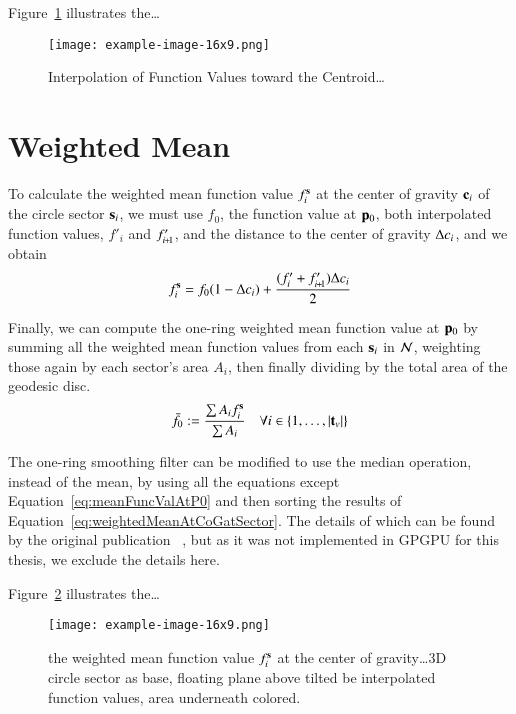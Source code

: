 Figure~\ref{fig:interpolation} illustrates the\dots
\begin{figure}[ht]
\ffigbox
	{\texttt{[image: example-image-16x9.png]}}
	{\caption[Interpolation of Function Values toward the Centroid]{Interpolation of Function Values toward the Centroid\ldots}\label{fig:interpolation}}
\end{figure}

%
%
%
%
\section{Weighted Mean}
\label{ch4sWM}
To calculate the weighted mean function value $f^\bs_i$ at the center of gravity $\mathbf{c}_i$ of the circle sector $\mathbf{s}_i$, we must use $f_0$, the function value at $\mathbf{p}_0$, both interpolated function values, $f'_i$ and $f'_{\sipo}$, and the distance to the center of gravity $\Delta c_i$, and we obtain
\begin{equation}
	f^\bs_i = f_0(1 - \Dc_i) + \frac{(f'_i + f'_{\sipo})\Dc_i}{2}
	\label{eq:weightedMeanAtCoGatSector}
\end{equation}%
%

Finally, we can compute the one-ring weighted mean function value at $\mathbf{p}_0$ by summing all the weighted mean function values from each $\mathbf{s}_i$ in $\mathcal{N}$, weighting those again by each sector's area $A_i$, then finally dividing by the total area of the geodesic disc.
\begin{equation}
	\bar{f}_0 := \frac{\sum A_if^{\mathbf{s}}_i}{\sum A_i} \quad \forall i \in \{1,\ldots,|\mathbf{t}_v|\}
	\label{eq:meanFuncValAtP0}
\end{equation}%
%

The one-ring smoothing filter can be modified to use the median operation, instead of the mean, by using all the equations except Equation~\ref{eq:meanFuncValAtP0} and then sorting the results of Equation~\ref{eq:weightedMeanAtCoGatSector}. The details of which can be found by the original publication ~\cite[s.~3.2]{Mara17}, but as it was not implemented in GPGPU for this thesis, we exclude the details here.

Figure~\ref{fig:weightedMean} illustrates the\dots
\begin{figure}[ht]
\ffigbox
	{\texttt{[image: example-image-16x9.png]}}
	{\caption[Weighted Mean function value $f^\bs_i$ at the center of gravity]{the weighted mean function value $f^\bs_i$ at the center of gravity\ldots 3D circle sector as base, floating plane above tilted be interpolated function values, area underneath colored.}\label{fig:weightedMean}}
\end{figure}
%
